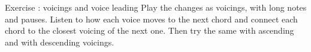 \begin{study}{Exercise \theexercise: voicings and voice leading}
Play the changes as voicings, with long notes and pauses. Listen to how each voice
moves to the next chord and connect each chord to the closest voicing of the next one.
Then try the same with ascending and with descending voicings.
\end{study}
